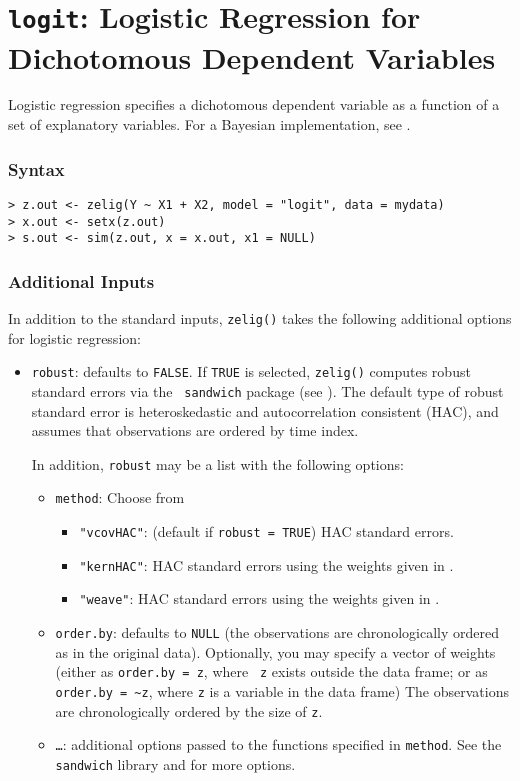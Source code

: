 \documentclass{article}
\begin{document}
\nobibliography*



\section{{\tt logit}: Logistic Regression for Dichotomous Dependent
Variables}\label{logit}

Logistic regression specifies a dichotomous dependent variable as a
function of a set of explanatory variables.  For a Bayesian
implementation, see .  

\subsubsection{Syntax}

\begin{verbatim}
> z.out <- zelig(Y ~ X1 + X2, model = "logit", data = mydata)
> x.out <- setx(z.out)
> s.out <- sim(z.out, x = x.out, x1 = NULL)
\end{verbatim}

\subsubsection{Additional Inputs} 

In addition to the standard inputs, {\tt zelig()} takes the following
additional options for logistic regression:  
\begin{itemize}
\item {\tt robust}: defaults to {\tt FALSE}.  If {\tt TRUE} is
selected, {\tt zelig()} computes robust standard errors via the {\tt
sandwich} package (see \cite{Zeileis04}).  The default type of robust
standard error is heteroskedastic and autocorrelation consistent (HAC),
and assumes that observations are ordered by time index.

In addition, {\tt robust} may be a list with the following options:  
\begin{itemize}
\item {\tt method}:  Choose from 
\begin{itemize}
\item {\tt "vcovHAC"}: (default if {\tt robust = TRUE}) HAC standard
errors. 
\item {\tt "kernHAC"}: HAC standard errors using the
weights given in \cite{Andrews91}. 
\item {\tt "weave"}: HAC standard errors using the
weights given in \cite{LumHea99}.  
\end{itemize}  
\item {\tt order.by}: defaults to {\tt NULL} (the observations are
chronologically ordered as in the original data).  Optionally, you may
specify a vector of weights (either as {\tt order.by = z}, where {\tt
z} exists outside the data frame; or as {\tt order.by = \~{}z}, where
{\tt z} is a variable in the data frame)  The observations are
chronologically ordered by the size of {\tt z}.
\item {\tt \dots}:  additional options passed to the functions 
specified in {\tt method}.   See the {\tt sandwich} library and
\cite{Zeileis04} for more options.   
\end{itemize}
\end{itemize}
\end{document}
